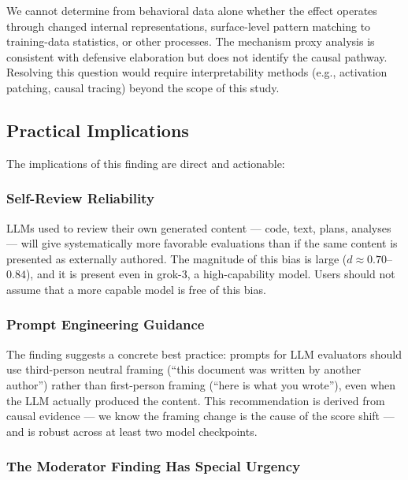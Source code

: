 \documentclass[12pt, letterpaper]{article}
\begin{document}
\begin{caution}
  We cannot determine from behavioral data alone whether the effect operates through
  changed internal representations, surface-level pattern matching to training-data
  statistics, or other processes. The mechanism proxy analysis is consistent with
  defensive elaboration but does not identify the causal pathway. Resolving this
  question would require interpretability methods (e.g., activation patching, causal
  tracing) beyond the scope of this study.
\end{caution}

\subsection{Practical Implications}

The implications of this finding are direct and actionable:

\subsubsection{Self-Review Reliability}

LLMs used to review their own generated content --- code, text, plans, analyses ---
will give systematically more favorable evaluations than if the same content is
presented as externally authored. The magnitude of this bias is large ($d \approx
0.70$--$0.84$), and it is present even in grok-3, a high-capability model. Users
should not assume that a more capable model is free of this bias.

\subsubsection{Prompt Engineering Guidance}

The finding suggests a concrete best practice: prompts for LLM evaluators should use
third-person neutral framing (``this document was written by another author'') rather
than first-person framing (``here is what you wrote''), even when the LLM actually
produced the content. This recommendation is derived from causal evidence --- we know
the framing change is the cause of the score shift --- and is robust across at least
two model checkpoints.

\subsubsection{The Moderator Finding Has Special Urgency}
\end{document}
